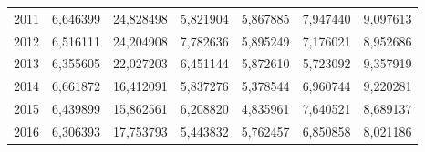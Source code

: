 \begin{table}
\begin{tabular}{p{1cm}p{2cm}p{2cm}p{2cm}p{2cm}p{2cm}p{2cm}}
 2011 &                         6,646399 &           24,828498 & 5,821904 &                                5,867885 &          7,947440 &           9,097613 \\
 2012 &                         6,516111 &           24,204908 & 7,782636 &                                5,895249 &          7,176021 &           8,952686 \\
 2013 &                         6,355605 &           22,027203 & 6,451144 &                                5,872610 &          5,723092 &           9,357919 \\
 2014 &                         6,661872 &           16,412091 & 5,837276 &                                5,378544 &          6,960744 &           9,220281 \\
 2015 &                         6,439899 &           15,862561 & 6,208820 &                                4,835961 &          7,640521 &           8,689137 \\
 2016 &                         6,306393 &           17,753793 & 5,443832 &                                5,762457 &          6,850858 &           8,021186 \\
\bottomrule
\end{tabular}
\end{table}
